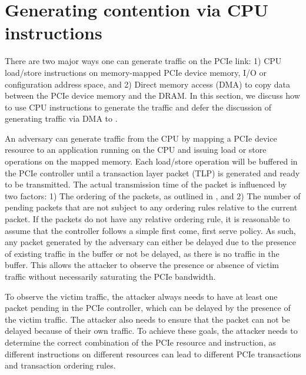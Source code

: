 \section{Generating contention via CPU instructions}
\label{sec:interconnect-sc-store-ops}

There are two major ways one can generate traffic on the PCIe link: 
1) CPU load/store instructions on memory-mapped PCIe device memory, I/O or configuration address space, and 
2) Direct memory access (DMA) to copy data between the PCIe device memory and the DRAM.
In this section, we discuss how to use CPU instructions to generate the traffic and defer the discussion of generating traffic via DMA to .

An adversary can generate traffic from the CPU by mapping a PCIe device resource to an application running on the CPU and issuing load or store operations on the mapped memory.
Each load/store operation will be buffered in the PCIe controller until a transaction layer packet (TLP) is generated and ready to be transmitted.
The actual transmission time of the packet is influenced by two factors:
1) The ordering of the packets, as outlined in , and
2) The number of pending packets that are not subject to any ordering rules relative to the current packet.
If the packets do not have any relative ordering rule, it is reasonable to assume that the controller follows a simple first come, first serve policy.
As such, any packet generated by the adversary can either be delayed due to the presence of existing traffic in the buffer or not be delayed, as there is no traffic in the buffer.
This allows the attacker to observe the presence or absence of victim traffic without necessarily saturating the PCIe bandwidth.


To observe the victim traffic, the attacker always needs to have at least one packet pending in the PCIe controller, which can be delayed by the presence of the victim traffic.
The attacker also needs to ensure that the packet can not be delayed because of their own traffic.
To achieve these goals, the attacker needs to determine the correct combination of the PCIe resource and instruction, as different instructions on different resources can lead to different PCIe transactions and transaction ordering rules.





